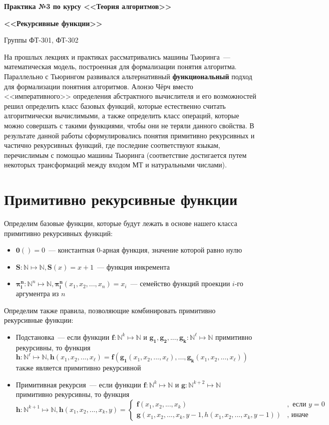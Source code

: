 \documentclass[
    11pt,
    a4paper
]{article}
\theoremstyle{definition}
\begin{document}
\centerline{\Large \bf Практика №3 по курсу <<Теория алгоритмов>>}
\centerline{\Large \bf <<Рекурсивные функции>>}
\centerline{Группы ФТ-301, ФТ-302}

На прошлых лекциях и практиках рассматривались машины Тьюринга~--- математическая модель, построенная для формализации понятия алгоритма. Параллельно с Тьюрингом развивался альтернативный \textbf{функциональный} подход для формализации понятния алгоритмов. Алонзо Чёрч вместо <<императивного>> определения абстрактного вычислителя и его возможностей решил определить класс базовых функций, которые естественно считать алгоритмически вычислимыми, а также определить класс операций, которые можно совершать с такими функциями, чтобы они не теряли данного свойства. В результате данной работы сформулировались понятия примитивно рекурсивных и частично рекурсивных функций, где последние соответствуют языкам, перечислимым с помощью машины Тьюринга (соответствие достигается путем некоторых трансформаций между входом МТ и натуральными числами).

\section{Примитивно рекурсивные функции}

Определим базовые функции, которые будут лежать в основе нашего класса примитивно рекурсивных функций:
\begin{itemize}
\item $\mathbf{0}() = 0$~--- константная 0-арная функция, значение которой равно нулю
\item $\mathbf{S}: \mathbb{N} \mapsto \mathbb{N}, \mathbf{S}(x) = x + 1$~--- функция инкремента
\item $\mathbf{\pi_i^n}: \mathbb{N}^n \mapsto \mathbb{N}, \mathbf{\pi_i^n}(x_1, x_2, ..., x_n) = x_i$~--- семейство функций проекции $i$-го аргументра из $n$ 
\end{itemize}

Определим также правила, позволяющие комбинировать примитивно рекурсивные функции:
\begin{itemize}
\item Подстановка~--- если функции $\mathbf{f}: \mathbb{N}^k \mapsto \mathbb{N}$ и $\mathbf{g_1}, \mathbf{g_2}, ..., \mathbf{g_k}: \mathbb{N}^\ell \mapsto \mathbb{N}$ примитивно рекурсивны, то функция $\mathbf{h}: \mathbb{N}^\ell \mapsto \mathbb{N}, \mathbf{h}(x_1, x_2, ..., x_\ell) = \mathbf{f}(\mathbf{g_1}(x_1, x_2, ..., x_\ell), ..., \mathbf{g_k}(x_1, x_2, ..., x_\ell))$ также является примитивно рекурсивной

\item Примитивная рекурсия~--- если функции $\mathbf{f}: \mathbb{N}^k \mapsto \mathbb{N}$ и $\mathbf{g}: \mathbb{N}^{k+2} \mapsto \mathbb{N}$ примитивно рекурсивны, то функция $\mathbf{h}: \mathbb{N}^{k+1} \mapsto \mathbb{N}, \mathbf{h}(x_1, x_2, ..., x_k, y) = \begin{cases}
\mathbf{f}(x_1, x_2, ..., x_k)&, \text{ если } y = 0\\
\mathbf{g}(x_1, x_2, ..., x_k, y - 1, h(x_1, x_2, ..., x_k, y - 1))&, \text{ иначе }
\end{cases}$
\end{itemize}
\end{document}
